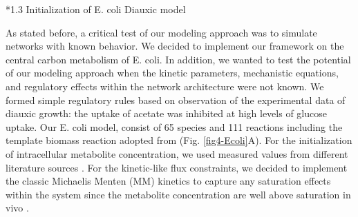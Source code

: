 \documentclass[12pt]{article}
\makeatletter
\renewcommand\subsection{\@startsection
	{subsection}{2}{0mm}
	{-0.05in}
	{-0.5\baselineskip}
	{\normalfont\normalsize\bfseries}}
\makeatother
\begin{document}
\subsection*{1.3 Initialization of E. coli Diauxic model}

As stated before, a critical test of our modeling approach was to simulate networks with known behavior. We decided to implement our framework on the central carbon metabolism of E. coli. In addition, we wanted to test the potential of our modeling approach when the kinetic parameters, mechanistic equations, and regulatory effects within the network architecture were not known. We formed simple regulatory rules based on observation of the experimental data \cite{varma1994stoichiometric} of diauxic growth: the uptake of acetate was inhibited at high levels of glucose uptake. Our E. coli model, consist of 65 species and 111 reactions including the template biomass reaction adopted from \cite{bennett2009absolute} (Fig. \ref{fig4-Ecoli}A). For the initialization of intracellular metabolite concentration, we used measured values from different literature sources \cite{bennett2009absolute,heijnen2010impact}. For the kinetic-like flux constraints, we decided to implement the classic Michaelis Menten (MM) kinetics to capture any saturation effects within the system since the metabolite concentration are well above saturation in vivo \cite{bennett2009absolute}.
\end{document}
